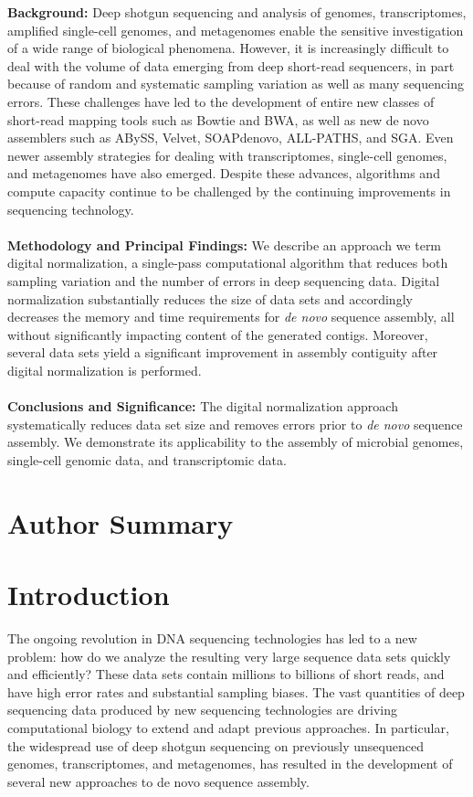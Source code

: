 \documentclass[10pt,draft]{article}
\begin{document}
{\bf Background:} Deep shotgun sequencing and analysis of genomes,
transcriptomes, amplified single-cell genomes, and metagenomes enable
the sensitive investigation of a wide range of biological
phenomena. However, it is increasingly difficult to deal with the volume of data
emerging from deep short-read sequencers, in part because of random
and systematic sampling variation as well as many sequencing errors.
These challenges have led to the development of entire new classes of
short-read mapping tools such as Bowtie and BWA, as well as new de
novo assemblers such as ABySS, Velvet, SOAPdenovo, ALL-PATHS, and SGA.
Even newer assembly strategies for dealing with transcriptomes,
single-cell genomes, and metagenomes have also emerged.  Despite these
advances, algorithms and compute capacity continue to be challenged by
the continuing improvements in sequencing technology.
\\
\\
{\bf Methodology and Principal Findings:} We describe an approach we term
digital normalization, a single-pass computational algorithm that
reduces both sampling variation and the number of errors in deep sequencing data. Digital normalization substantially
reduces the size of data sets and accordingly decreases the memory and time
requirements for {\em de novo} sequence assembly, all without significantly
impacting content of the generated contigs.  Moreover, several data sets
yield a significant improvement in assembly contiguity after digital normalization
is performed.
\\
\\
{\bf Conclusions and Significance:} The digital normalization approach
systematically reduces data set size and removes errors prior to {\em
de novo} sequence assembly.  We demonstrate its
applicability to the assembly of microbial genomes, single-cell
genomic data, and transcriptomic data.

\section*{Author Summary}

\section*{Introduction}

The ongoing revolution in DNA sequencing technologies has led to a new
problem: how do we analyze the resulting very large sequence data sets
quickly and efficiently? These data sets contain millions to billions
of short reads, and have high error rates and substantial sampling
biases.  The vast quantities of deep sequencing data produced by
new sequencing technologies are driving
computational biology to extend and adapt previous approaches.  In
particular, the widespread use of deep shotgun sequencing on
previously unsequenced genomes, transcriptomes, and metagenomes, has
resulted in the development of several new approaches to de novo
sequence assembly.
\end{document}
